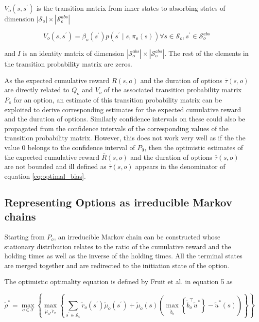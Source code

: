 $V_o(s, s^\prime)$ is the transition matrix from inner states to absorbing states of dimension $|\mathcal{S}_o| \times |\mathcal{S}_o^{abs}|$

\begin{equation}
    V_o(s, s^\prime) = \beta_o(s^\prime) p(s^\prime \mid s, \pi_o(s)) \forall s \in \mathcal{S}_o, s^\prime \in \mathcal{S}_o^{abs}
\end{equation}

and $I$ is an identity matrix of dimension $|\mathcal{S}_o^{abs}| \times |\mathcal{S}_o^{abs}|$.
The rest of the elements in the transition probability matrix are zeros.

As the expected cumulative reward $\bar{R}(s, o)$ and the duration of options $\bar{\tau}(s, o)$ are directly related to $Q_o$ and $V_o$ of the associated transition probability matrix $P_o$ for an option, an estimate of this transition probability matrix can be exploited to derive corresponding estimates for the expected cumulative reward and the duration of options.
Similarly confidence intervals on these could also be propagated from the confidence intervals of the corresponding values of the transition probability matrix.
However, this does not work very well as if the the value 0 belongs to the confidence interval of $P_0$, then the optimistic estimates of the expected cumulative reward $\bar{R}(s, o)$ and the duration of options $\bar{\tau}(s, o)$ are not bounded and ill defined as $\bar{\tau}(s, o)$ appears in the denominator of equation \ref{eq:optimal_bias}.


\subsection{Representing Options as irreducible Markov chains}

Starting from $P_o$, an irreducible Markov chain can be constructed whose stationary distribution relates to the ratio of the cumulative reward and the holding times as well as the inverse of the holding times.
All the terminal states are merged together and are redirected to the initiation state of the option.

The optimistic optimality equation is defined by Fruit et al. \cite{fruit_regret_2017} in equation 5 as

\begin{equation}
    \label{eqn:fruit5}
    \tilde{\rho}^* = \max_{o \in \mathcal{S}} \left\{ \max_{\tilde{\mu}_o, \tilde{r}_o} \left\{ \sum_{s^\prime \in \mathcal{S}_o} \tilde{r}_o(s^\prime) \tilde{\mu}_o(s^\prime) + \tilde{\mu}_o(s) \left( \max_{\tilde{b}_o}\left\{ \tilde{b}_o^\top \tilde{u}^* \right\} - \tilde{u}^*(s) \right)  \right\} \right\}
\end{equation}

